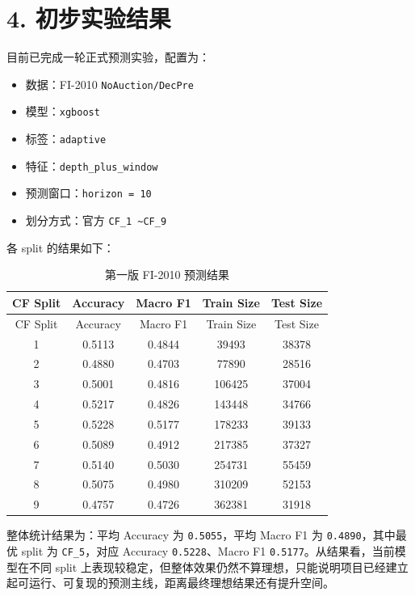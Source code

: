 \documentclass[11pt]{ctexart}
\begin{document}
\section*{4. 初步实验结果}
目前已完成一轮正式预测实验，配置为：
\begin{itemize}[leftmargin=*]
    \item 数据：FI-2010 \texttt{NoAuction/DecPre}
    \item 模型：\texttt{xgboost}
    \item 标签：\texttt{adaptive}
    \item 特征：\texttt{depth\_plus\_window}
    \item 预测窗口：\texttt{horizon = 10}
    \item 划分方式：官方 \texttt{CF\_1 \textasciitilde CF\_9}
\end{itemize}

各 split 的结果如下：

\begin{longtable}{ccccc}
\caption{第一版 FI-2010 预测结果}
\label{tab:compact-first-round}\\
\toprule
CF Split & Accuracy & Macro F1 & Train Size & Test Size \\
\midrule
\endfirsthead
\toprule
CF Split & Accuracy & Macro F1 & Train Size & Test Size \\
\midrule
\endhead
1 & 0.5113 & 0.4844 & 39493 & 38378 \\
2 & 0.4880 & 0.4703 & 77890 & 28516 \\
3 & 0.5001 & 0.4816 & 106425 & 37004 \\
4 & 0.5217 & 0.4826 & 143448 & 34766 \\
5 & 0.5228 & 0.5177 & 178233 & 39133 \\
6 & 0.5089 & 0.4912 & 217385 & 37327 \\
7 & 0.5140 & 0.5030 & 254731 & 55459 \\
8 & 0.5075 & 0.4980 & 310209 & 52153 \\
9 & 0.4757 & 0.4726 & 362381 & 31918 \\
\bottomrule
\end{longtable}

整体统计结果为：平均 Accuracy 为 \texttt{0.5055}，平均 Macro F1 为 \texttt{0.4890}，其中最优 split 为 \texttt{CF\_5}，对应 Accuracy \texttt{0.5228}、Macro F1 \texttt{0.5177}。从结果看，当前模型在不同 split 上表现较稳定，但整体效果仍然不算理想，只能说明项目已经建立起可运行、可复现的预测主线，距离最终理想结果还有提升空间。
\end{document}

